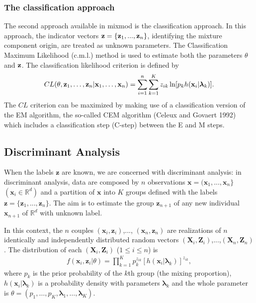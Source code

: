 \documentclass[12pt]{article}
\newcommand{\IR}{\mathbb{R}}
\newcommand{\bx}{\mathbf{x}}
\newcommand{\bX}{\mathbf{X}}
\newcommand{\bZ}{\mathbf{Z}}
\newcommand{\bz}{\mathbf{z}}
\newcommand{\blambda}{\boldsymbol{\lambda}}
\begin{document}
\subsubsection{The classification approach}
The second approach available in {\sc mixmod} is the classification approach.  In this
approach, the indicator vectors ${\bf z}=\{ {\bf z}_1,...,{\bf z}_n\}$, identifying the mixture
component origin, are treated as unknown parameters. The Classification Maximum Likelihood
(c.m.l.) method is used to estimate both the parameters $\theta$ and ${\bf z}$.  The
classification likelihood criterion is defined by
\begin{equation} \label{cl}
  CL(\theta, {\bf z}_{1},\ldots,{\bf z}_{n}|{\bf
    x}_{1},\ldots,{\bf x}_{n}) = \sum_{i=1}^n\sum_{k=1}^{K}
  z_{ik}\ln[p_{k} h({\bf x}_i|\blambda_k)].
\end{equation}
The $CL$ criterion can be maximized by making use of a classification version of the EM
algorithm, the so-called CEM algorithm (Celeux and Govaert 1992) which includes a
classification step (C-step) between the E and M steps.

\subsection{Discriminant Analysis}
When the labels ${\bz}$ are known, we are concerned with discriminant analysis: in discriminant
analysis, data are composed by $n$ observations $\bx=(\bx_1,...,\bx_n\}$ $(\bx_i \in \IR^d)$
and a partition of $\bx$ into $K$ groups defined with the labels $\bz=\{\bz_1,...,\bz_n\}$. The
aim is to estimate the group $\bz_{n+1}$ of any new individual $\bx_{n+1}$ of $\IR^d$ with
unknown label.

In this context, the $n$ couples $(\bx_i,\bz_i)$,..., $(\bx_n,\bz_n)$ are realizations of $n$
identically and independently distributed random vectors $(\bX_i,\bZ_i)$,...,$(\bX_n,\bZ_n)$.
The distribution of each $(\bX_i,\bZ_i)$ ($1\leq i\leq n$) is
\begin{eqnarray}
  f(\bx_i,\bz_i|\theta) = \prod_{k=1}^K p_k^{z_{ik}}[h(\bx_i| \blambda_k)]^{z_{ik}},
\end{eqnarray}
where $p_k$ is the prior probability of the $k$th group (the mixing proportion), $h(\bx_i|
\blambda_k)$ is a probability density with parameters $\blambda_k$ and the whole parameter is
$\theta=(p_1,\ldots,p_{K},\blambda_1,\ldots,\blambda_K)$.
\end{document}
